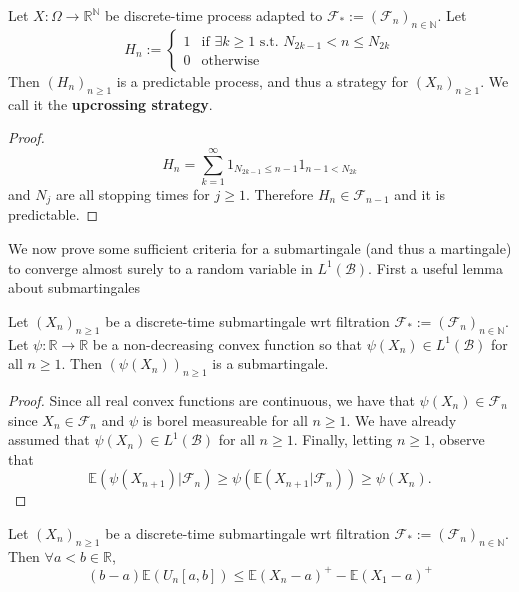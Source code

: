 \begin{proposition}
    Let $X: \Omega \to \mathbb{R}^{\mathbb{N}}$ be discrete-time process adapted to $\mathcal{F}_{*} := (\mathcal{F}_{n})_{n \in \mathbb{N}}$. Let
    $$H_{n} := \begin{cases} 
    1 & \text{if } \exists k \geq 1 \text{ s.t. } N_{2k-1} < n \leq N_{2k} \\
    0  & \text{otherwise}
    \end{cases}$$
    Then $(H_{n})_{n \geq 1}$ is a predictable process, and thus a strategy for $(X_{n})_{n \geq 1}$. We call it the \textbf{upcrossing strategy}.
\end{proposition}

\begin{proof}
    $$H_{n} = \sum\limits_{k=1}^{\infty} 1_{N_{2k-1} \leq n-1} 1_{n-1 < N_{2k}}$$
    and $N_{j}$ are all stopping times for $j \geq 1$. Therefore $H_{n} \in \mathcal{F}_{n-1}$ and it is predictable.
\end{proof}

We now prove some sufficient criteria for a submartingale (and thus a martingale) to converge almost surely to a random variable in \(L^{1}(\mathcal{B})\). First a useful lemma about submartingales

\begin{lemma}
    Let $(X_{n})_{n \geq 1}$ be a discrete-time submartingale wrt filtration $\mathcal{F}_{*} := (\mathcal{F}_{n})_{n \in \mathbb{N}}$. Let \(\psi: \mathbb{R} \to \mathbb{R}\) be a non-decreasing convex function so that \(\psi(X_{n}) \in L^{1}(\mathcal{B})\) for all \(n \geq 1\). Then $(\psi(X_{n}))_{n \geq 1}$ is a submartingale. 
\end{lemma}

\begin{proof}
    Since all real convex functions are continuous, we have that \(\psi(X_{n}) \in \mathcal{F}_{n}\) since \(X_{n} \in \mathcal{F}_{n}\) and \(\psi\) is borel measureable for all \(n \geq 1\). We have already assumed that \(\psi(X_{n}) \in L^{1}(\mathcal{B})\) for all \(n \geq 1\). Finally, letting \(n \geq 1\), observe that
    \[\mathbb{E}(\psi(X_{n+1})|\mathcal{F}_{n}) \geq \psi(\mathbb{E}(X_{n+1}|\mathcal{F}_{n})) \geq \psi(X_{n}).\]
\end{proof}

\begin{proposition}
    \label{upcrossing_inequality}
    Let $(X_{n})_{n \geq 1}$ be a discrete-time submartingale wrt filtration $\mathcal{F}_{*} := (\mathcal{F}_{n})_{n \in \mathbb{N}}$. Then $\forall a < b \in \mathbb{R}$, 
    $$(b-a)\mathbb{E}(U_{n}[a,b]) \leq \mathbb{E}(X_{n} - a)^{+} - \mathbb{E}(X_{1} - a)^{+}$$
\end{proposition}

